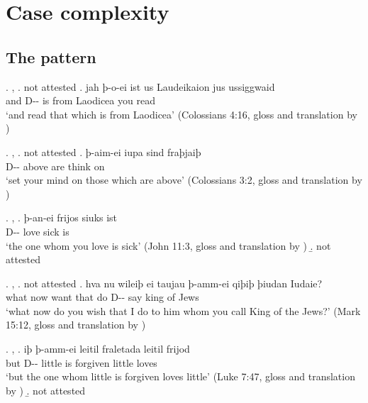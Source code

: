 
\chapter{Case complexity}

\section{The pattern}


\ex. , 
\a.  not attested
\bg. jah þ-o-ei ist us Laudeikaion jus ussiggwaid\\
 and D-- is\scsub{[nom]} from Laodicea you read\scsub{[acc]}\\
 `and read that which is from Laodicea' \hfill (Colossians 4:16, gloss and translation by \citealt[357]{harbert1978})

\ex. , 
\a.  not attested
\bg. þ-aim-ei iupa sind fraþjaiþ\\
 D-- above are\scsub{[nom]} {think on}\scsub{[dat]}\\
 `set your mind on those which are above' \hfill (Colossians 3:2, gloss and translation by \citealt[339]{harbert1978})

\ex. , 
\ag. þ-an-ei frijos siuks ist\\
 D-- love\scsub{[acc]} sick is\scsub{[nom]}\\
 `the one whom you love is sick' \hfill (John 11:3, gloss and translation by \citealt[342]{harbert1978})
\b.  not attested

\ex. , 
\a.  not attested
\bg. hva nu wileiþ ei taujau þ-amm-ei qiþiþ þiudan Iudaie?\\
 what now want that do\scsub{[dat]} D-- say\scsub{[acc]} king {of Jews}\\
 `what now do you wish that I do to him whom you call King of the Jews?' \hfill (Mark 15:12, gloss and translation by \citealt[339]{harbert1978})

\ex. , 
\ag. iþ þ-amm-ei leitil fraletada leitil frijod\\
 but D-- little {is forgiven\scsub{[dat]}} little loves\scsub{[nom]}\\
 `but the one whom little is forgiven loves little' \hfill (Luke 7:47, gloss and translation by \citealt[342]{harbert1978})
\b.  not attested

